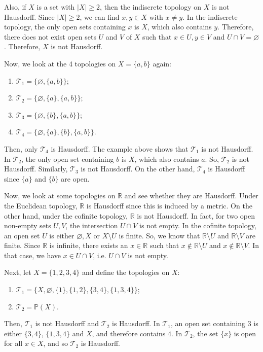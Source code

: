 \documentclass[a4paper, openany]{memoir}
\theoremstyle{definition}
\theoremstyle{plain}
\begin{document}
Also, if $X$ is a set with $|X| \geqslant 2$, then the indiscrete topology on $X$ is not Hausdorff. Since $|X| \geqslant 2$, we can find $x, y \in X$ with $x \neq y$. In the indiscrete topology, the only open sets containing $x$ is $X$, which also contains $y$. Therefore, there does not exist open sets $U$ and $V$ of $X$ such that $x \in U, y \in V$ and $U \cap V = \varnothing$. Therefore, $X$ is not Hausdorff.

Now, we look at the 4 topologies on $X = \{a, b\}$ again:
\begin{enumerate}
    \item $\mathcal{T}_1 = \{\varnothing, \{a, b\}\}$;
    \item $\mathcal{T}_2 = \{\varnothing, \{a\}, \{a, b\}\}$;
    \item $\mathcal{T}_3 = \{\varnothing, \{b\}, \{a, b\}\}$;
    \item $\mathcal{T}_4 = \{\varnothing, \{a\}, \{b\}, \{a, b\}\}$.
\end{enumerate}
Then, only $\mathcal{T}_4$ is Hausdorff. The example above shows that $\mathcal{T}_1$ is not Hausdorff. In $\mathcal{T}_2$, the only open set containing $b$ is $X$, which also contains $a$. So, $\mathcal{T}_2$ is not Hausdorff. Similarly, $\mathcal{T}_3$ is not Hausdorff. On the other hand, $\mathcal{T}_4$ is Hausdorff since $\{a\}$ and $\{b\}$ are open.

Now, we look at some topologies on $\mathbb{R}$ and see whether they are Hausdorff. Under the Euclidean topology, $\mathbb{R}$ is Hausdorff since this is induced by a metric. On the other hand, under the cofinite topology, $\mathbb{R}$ is not Hausdorff. In fact, for two open non-empty sets $U, V$, the intersection $U \cap V$ is not empty. In the cofinite topology, an open set $U$ is either $\varnothing, X$ or $X \setminus U$ is finite. So, we know that $\mathbb{R} \setminus U$ and $\mathbb{R} \setminus V$ are finite. Since $\mathbb{R}$ is infinite, there exists an $x \in \mathbb{R}$ such that $x \not\in \mathbb{R} \setminus U$ and $x \not\in \mathbb{R} \setminus V$. In that case, we have $x \in U \cap V$, i.e. $U \cap V$ is not empty.

Next, let $X = \{1, 2, 3, 4\}$ and define the topologies on $X$:
\begin{enumerate}
    \item $\mathcal{T}_1 = \{X, \varnothing, \{1\}, \{1, 2\}, \{3, 4\}, \{1, 3, 4\}\}$;
    \item $\mathcal{T}_2 = \mathbb{P}(X)$.
\end{enumerate}
Then, $\mathcal{T}_1$ is not Hausdorff and $\mathcal{T}_2$ is Hausdorff. In $\mathcal{T}_1$, an open set containing $3$ is either $\{3, 4\}$, $\{1, 3, 4\}$ and $X$, and therefore contains $4$. In $\mathcal{T}_2$, the set $\{x\}$ is open for all $x \in X$, and so $\mathcal{T}_2$ is Hausdorff.
\end{document}
